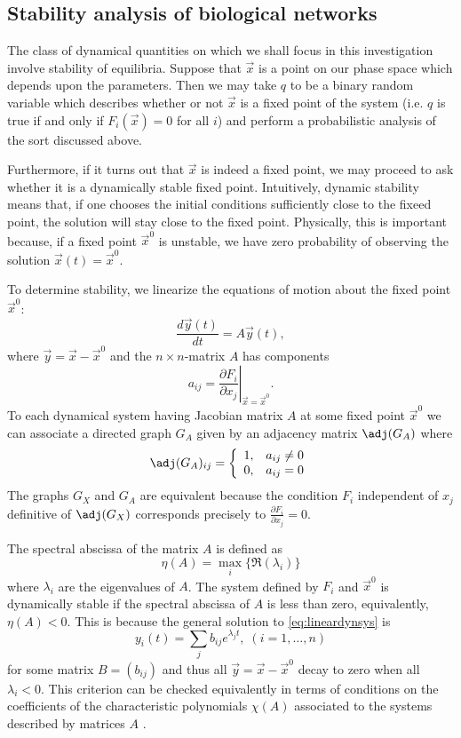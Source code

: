 \subsection{Stability analysis of biological networks}
The class of dynamical quantities on which we shall focus in this
investigation involve stability of equilibria.  Suppose that $\vec x$
is a point on our phase space which depends upon the parameters.  Then
we may take $q$ to be a binary random variable which describes whether
or not $\vec x$ is a fixed point of the system (i.e. $q$ is true if and only if
$F_i(\vec{x})=0$ for all $i$) and perform a probabilistic analysis
of the sort discussed above.

Furthermore, if it turns out that $\vec x$ is indeed a fixed point, we
may proceed to ask whether it is a dynamically stable fixed point.
Intuitively, dynamic stability means that, if one chooses the initial
conditions sufficiently close to the fixeed point, the solution will
stay close to the fixed point.  Physically, this is important because,
if a fixed point ${\vec x}^0$ is unstable, we have zero probability of
observing the solution ${\vec x}(t) = {\vec x}^0$.

To determine stability, we linearize the equations of motion about the
fixed point $\vec{x}^0$:
\begin{equation}\label{eq:lineardynsys}
\frac{d\vec{y}(t)}{dt} = A \vec{y}(t),
\end{equation}
where $\vec{y} = \vec{x} - \vec{x}^0$ and the $n \times n$-matrix $A$ has components
$$
a_{ij} = \left. \frac{\partial F_i}{\partial x_j} \right|_{\vec{x} = \vec{x}^0}.
$$
To each dynamical system having Jacobian matrix $A$ at some fixed point $\vec{x}^0$ we can associate a directed graph $G_A$ given by an adjacency matrix $\adj(G_A)$ where
 \begin{displaymath}
   \adj(G_A)_{ij} = \left\{
     \begin{array}{lr}
       1, & a_{ij} \neq 0\\
       0, & a_{ij} = 0
     \end{array}
   \right.
\end{displaymath}
The graphs $G_X$ and $G_A$ are equivalent because the condition $F_i$ independent of $x_j$ definitive of $\adj(G_X)$ corresponds precisely to $\frac{\partial F_i}{\partial x_j}=0$.

The spectral abscissa of the matrix $A$ is defined as
$$
\eta(A) = \max_i \{\Re(\lambda_i)\}
$$
where $\lambda_i$ are the eigenvalues of $A$. The system defined by $F_i$ and $\vec{x}^0$ is dynamically stable if the spectral abscissa of $A$ is less than zero, equivalently, $\eta(A) < 0$. This is because the general solution to \ref{eq:lineardynsys} is
$$
y_i(t) = \sum_j b_{ij} e^{\lambda_j t}, \; (i=1,\ldots,n)
$$
for some matrix $B=(b_{ij})$ and thus all $\vec{y} = \vec{x} - \vec{x}^0$ decay to zero when all $\lambda_i < 0$. This criterion can be checked equivalently in terms of conditions on the coefficients of the characteristic polynomials $\chi(A)$ associated to the systems described by matrices $A$ \cite{Gantmacher1959}.

